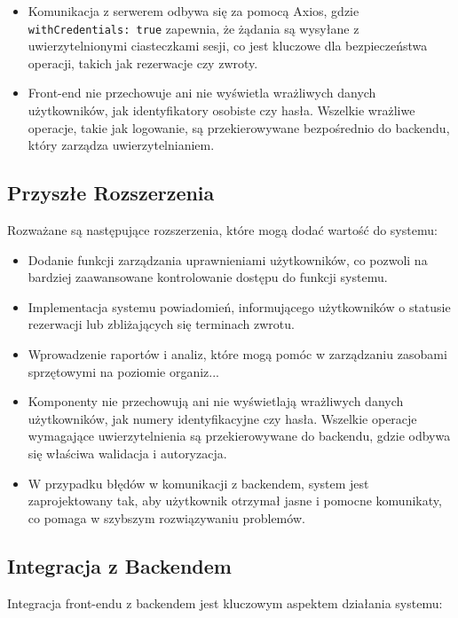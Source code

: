 \documentclass{article}
\begin{document}
\begin{itemize}
    \item Komunikacja z serwerem odbywa się za pomocą Axios, gdzie \texttt{withCredentials: true} zapewnia, że żądania są wysyłane z uwierzytelnionymi ciasteczkami sesji, co jest kluczowe dla bezpieczeństwa operacji, takich jak rezerwacje czy zwroty.
    \item Front-end nie przechowuje ani nie wyświetla wrażliwych danych użytkowników, jak identyfikatory osobiste czy hasła. Wszelkie wrażliwe operacje, takie jak logowanie, są przekierowywane bezpośrednio do backendu, który zarządza uwierzytelnianiem.
\end{itemize}

\subsection{Przyszłe Rozszerzenia}

Rozważane są następujące rozszerzenia, które mogą dodać wartość do systemu:

\begin{itemize}
    \item Dodanie funkcji zarządzania uprawnieniami użytkowników, co pozwoli na bardziej zaawansowane kontrolowanie dostępu do funkcji systemu.
    \item Implementacja systemu powiadomień, informującego użytkowników o statusie rezerwacji lub zbliżających się terminach zwrotu.
    \item Wprowadzenie raportów i analiz, które mogą pomóc w zarządzaniu zasobami sprzętowymi na poziomie organiz...
          \item Komponenty nie przechowują ani nie wyświetlają wrażliwych danych użytkowników, jak numery identyfikacyjne czy hasła. Wszelkie operacje wymagające uwierzytelnienia są przekierowywane do backendu, gdzie odbywa się właściwa walidacja i autoryzacja.
    \item W przypadku błędów w komunikacji z backendem, system jest zaprojektowany tak, aby użytkownik otrzymał jasne i pomocne komunikaty, co pomaga w szybszym rozwiązywaniu problemów.
\end{itemize}

\subsection{Integracja z Backendem}

Integracja front-endu z backendem jest kluczowym aspektem działania systemu:
\end{document}
